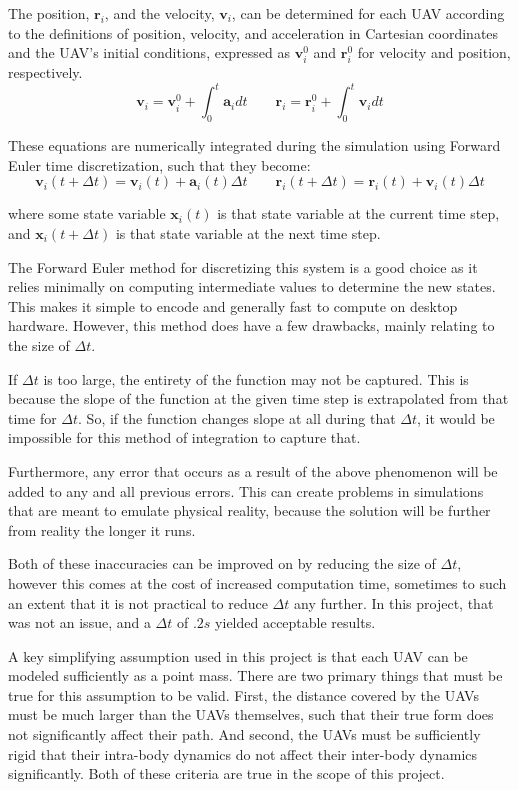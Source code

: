 \documentclass[a4paper,12pt]{report}
\begin{document}
The position, $\bm{r}_i$, and the velocity, $\bm{v}_i$, can be determined for each UAV according to the definitions of position, velocity, and acceleration in Cartesian coordinates and the UAV's initial conditions, expressed as $\bm{v}_i^0$ and $\bm{r}_i^0$ for velocity and position, respectively.
$$\bm{v}_i = \bm{v}_i^0 + \int_{0}^{t}{\bm{a}_i dt} \qquad \bm{r}_i = \bm{r}_i^0 + \int_{0}^{t}{\bm{v}_i dt}$$

These equations are numerically integrated during the simulation using Forward Euler time discretization, such that they become:
$$\bm{v}_i(t+\Delta t) = \bm{v} _i(t) + \bm{a}_i(t)\Delta t \qquad \bm{r}_i(t+\Delta t) = \bm{r}_i(t) + \bm{v}_i(t)\Delta t$$

where some state variable $\bm{x}_i(t)$ is that state variable at the current time step, and $\bm{x}_i(t+\Delta t)$ is that state variable at the next time step.

The Forward Euler method for discretizing this system is a good choice as it relies minimally on computing intermediate values to determine the new states. This makes it simple to encode and generally fast to compute on desktop hardware. However, this method does have a few drawbacks, mainly relating to the size of $\Delta t$.

If $\Delta t$ is too large, the entirety of the function may not be captured. This is because the slope of the function at the given time step is extrapolated from that time for $\Delta t$. So, if the function changes slope at all during that $\Delta t$, it would be impossible for this method of integration to capture that.

Furthermore, any error that occurs as a result of the above phenomenon will be added to any and all previous errors. This can create problems in simulations that are meant to emulate physical reality, because the solution will be further from reality the longer it runs.

Both of these inaccuracies can be improved on by reducing the size of $\Delta t$, however this comes at the cost of increased computation time, sometimes to such an extent that it is not practical to reduce $\Delta t$ any further. In this project, that was not an issue, and a $\Delta t$ of $.2s$ yielded acceptable results.

A key simplifying assumption used in this project is that each UAV can be modeled sufficiently as a point mass. There are two primary things that must be true for this assumption to be valid. First, the distance covered by the UAVs must be much larger than the UAVs themselves, such that their true form does not significantly affect their path. And second, the UAVs must be sufficiently rigid that their intra-body dynamics do not affect their inter-body dynamics significantly. Both of these criteria are true in the scope of this project.
\end{document}

